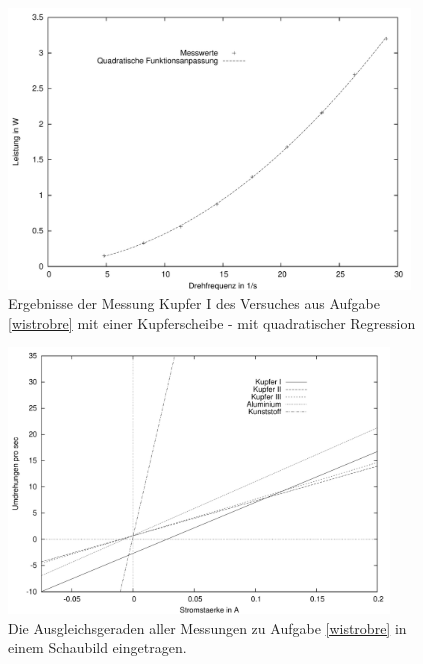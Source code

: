 \begin{figure}[htb]
	\centering
		\includegraphics[width=0.95\textwidth]{praktika/mat_praktika/c}
	\caption{Ergebnisse der Messung Kupfer I des Versuches aus Aufgabe \ref{wistrobre} mit einer Kupferscheibe - mit quadratischer Regression}
	\label{abbkup1b}
\end{figure}


\begin{figure}[htb]
	\centering
		\includegraphics[width=0.9\textwidth]{praktika/mat_praktika/sa1}
	\caption{Die Ausgleichsgeraden aller Messungen zu Aufgabe \ref{wistrobre} in einem Schaubild eingetragen.}
	\label{ausglger}
\end{figure}





